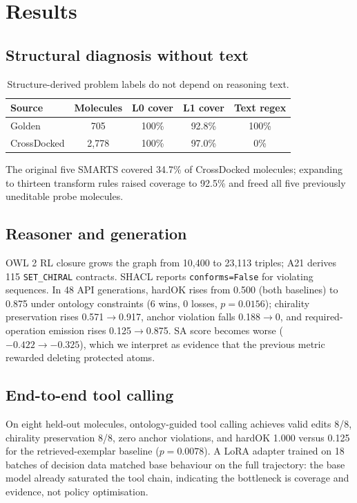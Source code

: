 \documentclass[11pt,a4paper]{article}
\begin{document}
\section{Results}
\subsection{Structural diagnosis without text}
\midsepenalty
\begin{table}[t]
\centering
\small
\begin{tabular}{lcccc}
\toprule
Source & Molecules & L0 cover & L1 cover & Text regex \\
\midrule
Golden & 705 & 100\% & 92.8\% & 100\% \\
CrossDocked & 2,778 & 100\% & 97.0\% & 0\% \\
\bottomrule
\end{tabular}
\caption{Structure-derived problem labels do not depend on reasoning text.}
\end{table}
The original five SMARTS covered 34.7\% of CrossDocked molecules; expanding to thirteen transform rules raised coverage to 92.5\% and freed all five previously uneditable probe molecules.

\subsection{Reasoner and generation}
OWL 2 RL closure grows the graph from 10,400 to 23,113 triples; A21 derives 115 \texttt{SET\_CHIRAL} contracts. SHACL reports \texttt{conforms=False} for violating sequences. In 48 API generations, hardOK rises from 0.500 (both baselines) to 0.875 under ontology constraints (6 wins, 0 losses, $p=0.0156$); chirality preservation rises 0.571$\to$0.917, anchor violation falls 0.188$\to$0, and required-operation emission rises 0.125$\to$0.875. SA score becomes worse ($-0.422\to-0.325$), which we interpret as evidence that the previous metric rewarded deleting protected atoms.

\subsection{End-to-end tool calling}
On eight held-out molecules, ontology-guided tool calling achieves valid edits 8/8, chirality preservation 8/8, zero anchor violations, and hardOK 1.000 versus 0.125 for the retrieved-exemplar baseline ($p=0.0078$). A LoRA adapter trained on 18 batches of decision data matched base behaviour on the full trajectory: the base model already saturated the tool chain, indicating the bottleneck is coverage and evidence, not policy optimisation.
\end{document}
